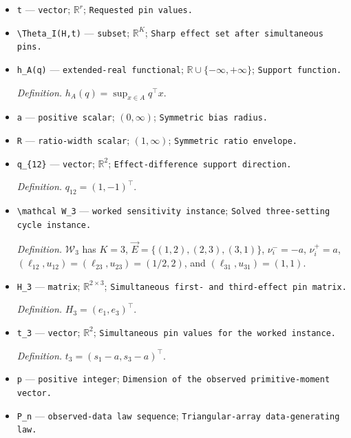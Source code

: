 \documentclass{article}
\begin{document}
\begin{itemize}
  \item \texttt{t} --- \texttt{vector}; \(\mathbb R^r\); \texttt{Requested pin values.}
  \item \texttt{\textbackslash{}\allowbreak{}Theta\_\allowbreak{}I(H,\allowbreak{}t)} --- \texttt{subset}; \(\mathbb R^K\); \texttt{Sharp effect set after simultaneous pins.}
  \item \texttt{h\_\allowbreak{}A(q)} --- \texttt{extended-\allowbreak{}real functional}; \(\mathbb R\cup\{-\infty,+\infty\}\); \texttt{Support function.}
  \par\smallskip\noindent\emph{Definition.} \(h_A(q)=\sup_{x\in A}q^\top x\).
  \item \texttt{a} --- \texttt{positive scalar}; \((0,\infty)\); \texttt{Symmetric bias radius.}
  \item \texttt{R} --- \texttt{ratio-\allowbreak{}width scalar}; \((1,\infty)\); \texttt{Symmetric ratio envelope.}
  \item \texttt{q\_\allowbreak{}\{12\}\allowbreak{}} --- \texttt{vector}; \(\mathbb R^2\); \texttt{Effect-\allowbreak{}difference support direction.}
  \par\smallskip\noindent\emph{Definition.} \(q_{12}=(1,-1)^\top\).
  \item \texttt{\textbackslash{}\allowbreak{}mathcal W\_\allowbreak{}3} --- \texttt{worked sensitivity instance}; \texttt{Solved three-\allowbreak{}setting cycle instance.}
  \par\smallskip\noindent\emph{Definition.} \(\mathcal W_3\) has \(K=3\), \(\vec E=\{(1,2),(2,3),(3,1)\}\), \(\nu_i^-=-a\), \(\nu_i^+=a\), \((\ell_{12},u_{12})=(\ell_{23},u_{23})=(1/2,2)\), and \((\ell_{31},u_{31})=(1,1)\).
  \item \texttt{H\_\allowbreak{}3} --- \texttt{matrix}; \(\mathbb R^{2\times3}\); \texttt{Simultaneous first-\allowbreak{} and third-\allowbreak{}effect pin matrix.}
  \par\smallskip\noindent\emph{Definition.} \(H_3=(e_1,e_3)^\top\).
  \item \texttt{t\_\allowbreak{}3} --- \texttt{vector}; \(\mathbb R^2\); \texttt{Simultaneous pin values for the worked instance.}
  \par\smallskip\noindent\emph{Definition.} \(t_3=(s_1-a,s_3-a)^\top\).
  \item \texttt{p} --- \texttt{positive integer}; \texttt{Dimension of the observed primitive-\allowbreak{}moment vector.}
  \item \texttt{P\_\allowbreak{}n} --- \texttt{observed-\allowbreak{}data law sequence}; \texttt{Triangular-\allowbreak{}array data-\allowbreak{}generating law.}

\end{itemize}
\end{document}
